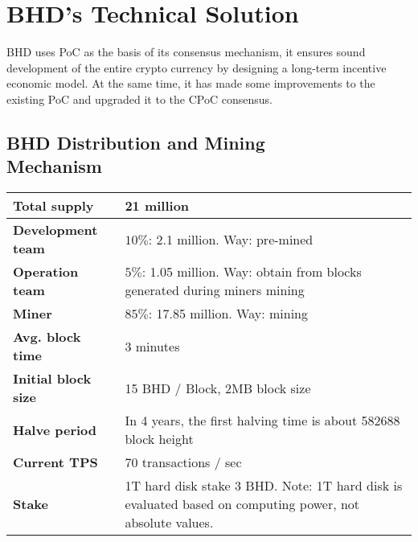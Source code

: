 \chapter{BHD's Technical Solution}
\begin{flushleft}
    BHD uses PoC as the basis of its consensus mechanism, it ensures sound development of the entire crypto currency by designing a long-term incentive economic model. At the same time, it has made some improvements to the existing PoC and upgraded it to the CPoC consensus.
\end{flushleft}
\section{BHD Distribution and Mining\\Mechanism}
\begin{tabular}{ |p{4cm}|p{8cm}| }
    \hline
    \textbf{Total supply}                           & 21 million                                                                                               \\[5pt]
    \hline
    \rowcolor{lightgray}\textbf{Development team}   & $10\%$: 2.1 million. Way: pre-mined                                                                      \\[5pt]
    \hline
    \textbf{Operation team}                         & $5\%$: 1.05 million. Way: obtain from blocks generated during miners mining                              \\[5pt]
    \hline
    \rowcolor{lightgray}\textbf{Miner}              & $85\%$: 17.85 million. Way: mining                                                                       \\[5pt]
    \hline
    \textbf{Avg. block time}                        & 3 minutes                                                                                                \\[5pt]
    \hline
    \rowcolor{lightgray}\textbf{Initial block size} & 15 BHD / Block, 2MB block size                                                                           \\[5pt]
    \hline
    \textbf{Halve period}                           & In 4 years, the first halving time is about 582688 block height                                          \\[5pt]
    \hline
    \rowcolor{lightgray}\textbf{Current TPS}        & 70 transactions / sec                                                                                    \\[5pt]
    \hline
    \textbf{Stake}                                  & 1T hard disk stake 3 BHD. Note: 1T hard disk is evaluated based on computing power, not absolute values. \\[5pt]
    \hline
\end{tabular}
